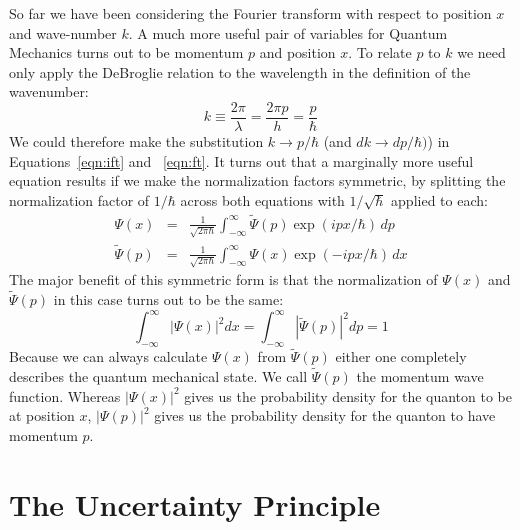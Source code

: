 \documentclass[12pt,oneside]{book}
\begin{document}
So far we have been considering the Fourier transform with respect to position $x$ and wave-number $k$.  A much more useful pair of variables for Quantum Mechanics turns out to be momentum $p$ and position $x$.  To relate $p$ to $k$ we need only apply the DeBroglie relation to the wavelength in the definition of the wavenumber:
\begin{displaymath}
k \equiv \frac{2 \pi}{\lambda} = \frac{2 \pi p}{h} = \frac{p}{\hbar}
\end{displaymath}
We could therefore make the substitution $k \to p/\hbar$ (and $dk \to dp / \hbar)$) in Equations~\ref{eqn:ift} and ~\ref{eqn:ft}.  It turns out that a marginally more useful equation results if we make the normalization factors symmetric, by splitting the normalization factor of $1/\hbar$ across both equations with $1/\sqrt{\hbar}$ applied to each:
\begin{eqnarray} 
\Psi(x) &=& \frac{1}{\sqrt{2\pi\hbar}} \int_{-\infty}^{\infty} \widetilde{\Psi}(p) \exp(ipx/\hbar) \, dp \\
\widetilde{\Psi}(p) &=&  \frac{1}{\sqrt{2\pi\hbar}} \int_{-\infty}^{\infty} {\Psi}(x) \exp(-ipx/\hbar) \, dx
\end{eqnarray}
The major benefit of this symmetric form is that the normalization of $\Psi(x)$ and $\widetilde{\Psi}(p)$ in this case turns out to be the same:
\begin{displaymath}
\int_{-\infty}^{\infty} |\Psi(x)|^2 dx = \int_{-\infty}^{\infty} |\widetilde{\Psi}(p)|^2 dp = 1 
\end{displaymath}
Because we can always calculate $\Psi(x)$ from $\widetilde{\Psi}(p)$ either one completely describes the quantum mechanical state.  We call $\widetilde{\Psi}(p)$ the momentum wave function.   Whereas $|\Psi(x)|^2$ gives us the probability density for the quanton to be at position $x$, $|\Psi(p)|^2$ gives us the probability density for the quanton to have momentum $p$.

\section{The Uncertainty Principle}
\end{document}
